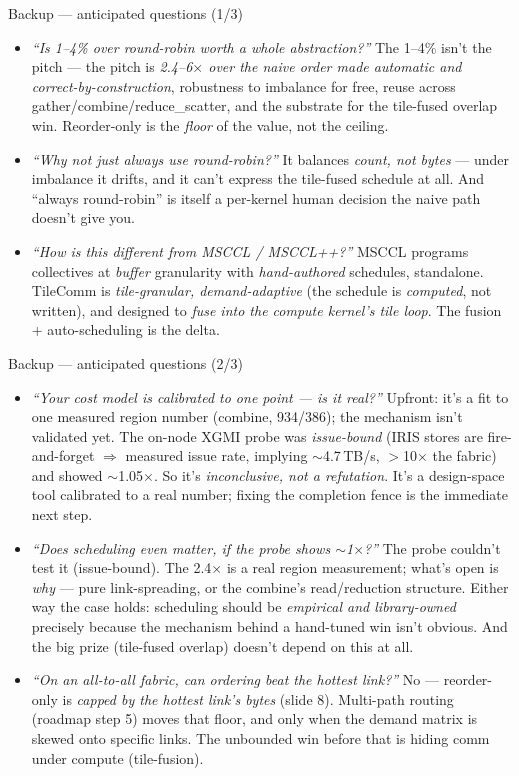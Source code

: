 \documentclass[pdf,aspectratio=169]{beamer}
\newcommand{\empy}[1]{{\color{darkorange}\emph{#1}}}
\newcommand{\empr}[1]{{\color{cardinalred}\emph{#1}}}
\begin{document}
\begin{frame}{Backup --- anticipated questions (1/3)}
\footnotesize
\begin{itemize}\footnotesize
  \item \empr{``Is 1--4\% over round-robin worth a whole abstraction?''} The 1--4\% isn't the pitch --- the pitch is \empy{2.4--6$\times$ over the naive order made automatic and correct-by-construction}, robustness to imbalance for free, reuse across gather/combine/reduce\_scatter, and the substrate for the tile-fused overlap win. Reorder-only is the \emph{floor} of the value, not the ceiling.
  \item \empr{``Why not just always use round-robin?''} It balances \emph{count, not bytes} --- under imbalance it drifts, and it can't express the tile-fused schedule at all. And ``always round-robin'' is itself a per-kernel human decision the naive path doesn't give you.
  \item \empr{``How is this different from MSCCL / MSCCL++?''} MSCCL programs collectives at \emph{buffer} granularity with \emph{hand-authored} schedules, standalone. TileComm is \empy{tile-granular, demand-adaptive} (the schedule is \emph{computed}, not written), and designed to \empy{fuse into the compute kernel's tile loop}. The fusion + auto-scheduling is the delta.
\end{itemize}
\end{frame}

\begin{frame}{Backup --- anticipated questions (2/3)}
\footnotesize
\begin{itemize}\footnotesize
  \item \empr{``Your cost model is calibrated to one point --- is it real?''} Upfront: it's a fit to one measured region number (combine, 934/386); the mechanism isn't validated yet. The on-node XGMI probe was \empy{issue-bound} (IRIS stores are fire-and-forget $\Rightarrow$ measured issue rate, implying $\sim$4.7\,TB/s, $>$10$\times$ the fabric) and showed $\sim$1.05$\times$. So it's \emph{inconclusive, not a refutation}. It's a design-space tool calibrated to a real number; fixing the completion fence is the immediate next step.
  \item \empr{``Does scheduling even matter, if the probe shows $\sim$1$\times$?''} The probe couldn't test it (issue-bound). The 2.4$\times$ is a real region measurement; what's open is \emph{why} --- pure link-spreading, or the combine's read/reduction structure. Either way the case holds: scheduling should be \empy{empirical and library-owned} precisely because the mechanism behind a hand-tuned win isn't obvious. And the big prize (tile-fused overlap) doesn't depend on this at all.
  \item \empr{``On an all-to-all fabric, can ordering beat the hottest link?''} No --- reorder-only is \empy{capped by the hottest link's bytes} (slide 8). Multi-path routing (roadmap step 5) moves that floor, and only when the demand matrix is skewed onto specific links. The unbounded win before that is hiding comm under compute (tile-fusion).
\end{itemize}
\end{frame}
\end{document}
